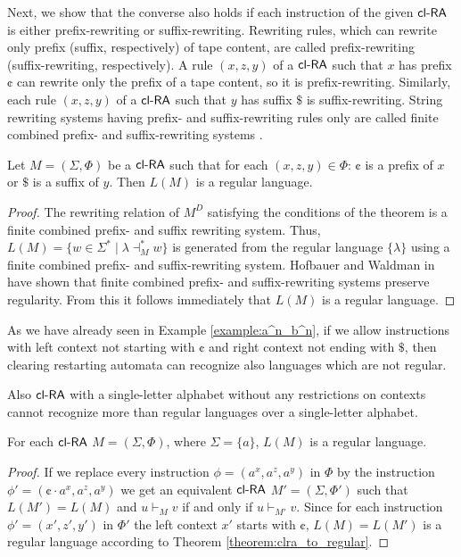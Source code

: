 Next, we show that the converse also holds if each instruction of the given $\mbox{\sf cl-RA\/}$ is either prefix-rewriting or suffix-rewriting. Rewriting rules, which can rewrite only prefix (suffix, respectively) of tape content, are called prefix-rewriting (suffix-rewriting, respectively). A rule $(x, z, y)$ of a $\mbox{\sf cl-RA\/}$ such that $x$ has prefix $\cent$ can rewrite only the prefix of a tape content, so it is prefix-rewriting. Similarly, each rule $(x, z, y)$ of a $\mbox{\sf cl-RA\/}$ such that $y$ has suffix $\$$ is suffix-rewriting. String rewriting systems having prefix- and suffix-rewriting rules only are called finite combined prefix- and suffix-rewriting systems \cite{Hofbauer2004301}.

\begin{theorem}\label{theorem:clra_to_regular}
Let $M=(\Sigma,\Phi)$ be a $\mbox{\sf cl-RA\/}$ such that for each $(x, z, y) \in \Phi$: $\cent$ is a prefix of $x$ or $\$$ is a suffix of $y$. Then $L(M)$ is a regular language.
\end{theorem}

\begin{proof}
The rewriting relation of $M^D$ satisfying the conditions of the theorem is a finite combined prefix- and suffix rewriting system. Thus, $L(M)=\{ w \in \Sigma^* \mid \lambda \dashv_M^* w \}$ is generated from the regular language $\{\lambda\}$ using a finite combined prefix- and suffix-rewriting system. Hofbauer and Waldman in \cite{Hofbauer2004301} have shown that finite combined prefix- and suffix-rewriting systems preserve regularity. From this it follows immediately that $L(M)$ is a regular language.
\end{proof}

As we have already seen in Example \ref{example:a^n_b^n}, if we allow instructions with left context not starting with $\cent$ and right context not ending with $\$$, then clearing restarting automata can recognize also languages which are not regular.

Also $\mbox{\sf cl-RA\/}$ with a single-letter alphabet without any restrictions on contexts cannot recognize more than regular languages over a single-letter alphabet.

\begin{lemma}
For each $\mbox{\sf cl-RA\/}$ $M = (\Sigma, \Phi)$, where $\Sigma = \{a\}$, $L(M)$ is a regular language.
\end{lemma}

\begin{proof}
If we replace every instruction $\phi = (a^x, a^z, a^y)$ in $\Phi$ by the instruction $\phi' = (\cent \cdot a^x, a^z, a^y)$ we get an equivalent $\mbox{\sf cl-RA\/}$ $M' = (\Sigma, \Phi')$ such that $L(M')=L(M)$ and $u \vdash_M v$ if and only if $u \vdash_{M'} v$. Since for each instruction $\phi' = (x', z', y')$ in $\Phi'$ the left context $x'$ starts with $\cent$, $L(M) = L(M')$ is a regular language according to Theorem \ref{theorem:clra_to_regular}.
\end{proof}

